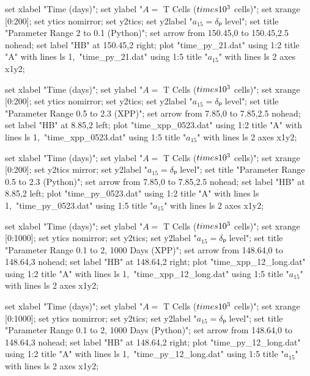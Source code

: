 \startGNUPLOTscript[time_py_21]
  set xlabel "Time (days)";
  set ylabel "$A = $ T Cells ($\\times 10^3$ cells)";
  set xrange [0:200];
  set ytics nomirror;
  set y2tics;
  set y2label "$a_{15} = δₚ$ level";
  set title "Parameter Range 2 to 0.1 (Python)";
  set arrow from 150.45,0 to 150.45,2.5 nohead;
  set label "HB" at 150.45,2 right;
  plot "time_py_21.dat" using 1:2 title "A" with lines ls 1,\
       "time_py_21.dat" using 1:5 title "$a_{15}$" with lines ls 2 axes x1y2;
\stopGNUPLOTscript

  set xlabel "Time (days)";
  set ylabel "$A = $ T Cells ($\\times 10^3$ cells)";
  set xrange [0:200];
  set ytics nomirror;
  set y2tics;
  set y2label "$a_{15} = δₚ$ level";
  set title "Parameter Range 0.5 to 2.3 (XPP)";
  set arrow from 7.85,0 to 7.85,2.5 nohead;
  set label "HB" at 8.85,2 left;
  plot "time_xpp_0523.dat" using 1:2 title "A" with lines ls 1,\
       "time_xpp_0523.dat" using 1:5 title "$a_{15}$" with lines ls 2 axes x1y2;
\stopGNUPLOTscript

\startGNUPLOTscript[time_py_0523]
  set xlabel "Time (days)";
  set ylabel "$A = $ T Cells ($\\times 10^3$ cells)";
  set xrange [0:200];
  set y2tics mirror;
  set y2label "$a_{15} = δₚ$ level";
  set title "Parameter Range 0.5 to 2.3 (Python)";
  set arrow from 7.85,0 to 7.85,2.5 nohead;
  set label "HB" at 8.85,2 left;
  plot "time_py_0523.dat" using 1:2 title "A" with lines ls 1,\
       "time_py_0523.dat" using 1:5 title "$a_{15}$" with lines ls 2 axes x1y2;
\stopGNUPLOTscript

  set xlabel "Time (days)";
  set ylabel "$A = $ T Cells ($\\times 10^3$ cells)";
  set xrange [0:1000];
  set ytics nomirror;
  set y2tics;
  set y2label "$a_{15} = δₚ$ level";
  set title "Parameter Range 0.1 to 2, 1000 Days (XPP)";
  set arrow from 148.64,0 to 148.64,3 nohead;
  set label "HB" at 148.64,2 right;
  plot "time_xpp_12_long.dat" using 1:2 title "A" with lines ls 1,\
       "time_xpp_12_long.dat" using 1:5 title "$a_{15}$" with lines ls 2 axes x1y2;
\stopGNUPLOTscript

\startGNUPLOTscript[time_py_12_long]
  set xlabel "Time (days)";
  set ylabel "$A = $ T Cells ($\\times 10^3$ cells)";
  set xrange [0:1000];
  set ytics nomirror;
  set y2tics;
  set y2label "$a_{15} = δₚ$ level";
  set title "Parameter Range 0.1 to 2, 1000 Days (Python)";
  set arrow from 148.64,0 to 148.64,3 nohead;
  set label "HB" at 148.64,2 right;
  plot "time_py_12_long.dat" using 1:2 title "A" with lines ls 1,\
       "time_py_12_long.dat" using 1:5 title "$a_{15}$" with lines ls 2 axes x1y2;
\stopGNUPLOTscript

